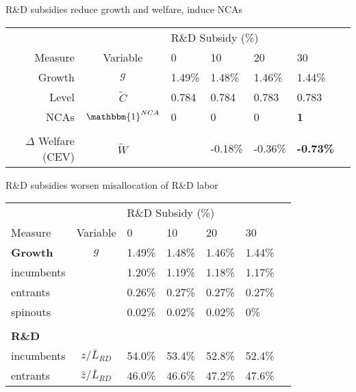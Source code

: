 \documentclass[english,usenames,dvipsnames]{beamer}
\begin{document}
\begin{frame}{R\&D subsidies reduce growth and welfare, induce NCAs}\label{RDsubsidy_table}
		\begin{table}
			\centering
			\small
			\begin{tabular}{rclllll}
				\toprule \toprule
				 &  & \multicolumn{4}{l}{R\&D Subsidy (\%)} \vspace{3pt} \tabularnewline
				Measure &Variable & 0 & 10 & 20 & 30 \tabularnewline
				\midrule
				Growth & $g$ & 1.49\% & 1.48\% & 1.46\% & 1.44\% \tabularnewline
				Level & $\tilde{C}$  & 0.784 &  0.784 & 0.783 & 0.783 \tabularnewline 
				NCAs & $\mathbbm{1}^{NCA}$ & 0 & 0 & 0 & \alert{\textbf{1}} \tabularnewline
				\tabularnewline
				$\Delta$ Welfare (CEV) & $\tilde{W}$  &  & -0.18\% & -0.36\% & \alert{\textbf{-0.73\%}} \tabularnewline
				\bottomrule
			\end{tabular}
		\end{table}
		\hyperlink{plots:rd_subsidies1}{}
		\hyperlink{plots:rd_subsidies2}{}
\end{frame}

\begin{frame}{R\&D subsidies worsen misallocation of R\&D labor}\label{rd_subsidies:decomposition_growth_decrease}
	\begin{table}
		\centering
		\small
		\begin{tabular}{lclllll}
			\toprule \toprule
			&  & \multicolumn{4}{l}{R\&D Subsidy (\%)} \vspace{3pt} \tabularnewline
			Measure &Variable & 0 & 10 & 20 & 30 \tabularnewline
			\midrule
			\textbf{Growth} & $g$ & 1.49\% & 1.48\% & 1.46\% & 1.44\% \tabularnewline
			\multicolumn{1}{l}{\quad incumbents} & & 1.20\% & 1.19\% & 1.18\% & 1.17\% \tabularnewline
			\multicolumn{1}{l}{\quad entrants} & & 0.26\% & 0.27\% & 0.27\% & 0.27\% \tabularnewline
			\multicolumn{1}{l}{\quad spinouts} &  & 0.02\% & 0.02\% & 0.02\% & 0\% \tabularnewline
			\tabularnewline
			\textbf{R\&D} & &  &  &  & \tabularnewline
			\multicolumn{1}{l}{\quad incumbents} & $z / \bar{L}_{RD}$ & 54.0\% & 53.4\% & 52.8\% & 52.4\% \tabularnewline
			\multicolumn{1}{l}{\quad entrants} & $\hat{z} / \bar{L}_{RD}$ & 46.0\% & 46.6\% & 47.2\% & 47.6\% \tabularnewline
			\bottomrule
		\end{tabular}
	\end{table}
	\hyperlink{plots:rd_subsidies1}{}
	\hyperlink{plots:rd_subsidies2}{}
\end{frame}
\end{document}
